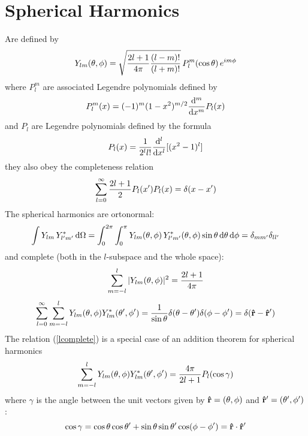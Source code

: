 \section{Spherical Harmonics}

Are defined by 
\begin{equation*}
  Y_{lm}(\theta,\phi)=\sqrt{{2l+1\over4\pi}{(l-m)!\over(l+m)!}}\,P_l^m(\cos\theta)\,e^{im\phi}
\end{equation*}
where $P_l^m$ are associated Legendre polynomials defined by 
\begin{equation*}
  P_l^m(x)=(-1)^m (1-x^2)^{m/2}{{\rm d}^m\over{\rm d} x^m} P_l(x)
\end{equation*}
and $P_l$ are Legendre polynomials defined by the formula 
\begin{equation*}
  P_l(x)={1\over2^l l!}{{\rm d}^l\over{\rm d} x^l}[(x^2-1)^l]
\end{equation*}
they also obey the completeness relation 
\begin{equation}
  \sum_{l=0}^\infty {2l+1\over2}P_l(x')P_l(x)=\delta(x-x')  \label{Lorto}
\end{equation}
The spherical harmonics are ortonormal: 
\begin{equation}
  \int Y_{lm}\,Y^*_{l'm'}\,{\rm d}\Omega = \int_0^{2\pi}\int_0^{\pi} Y_{lm}(\theta,\phi)\,Y^*_{l'm'}(\theta,\phi)\sin\theta\,{\rm d}\theta\,{\rm d}\phi = \delta_{mm'}\delta_{ll'}  \label{Yorto}
\end{equation}
and complete (both in the $l$-subspace and the whole space): 
\begin{equation}
  \sum_{m=-l}^l|Y_{lm}(\theta,\phi)|^2={2l+1\over4\pi}  \label{lcomplete}
\end{equation}
\begin{equation}
  \sum_{l=0}^\infty\sum_{m=-l}^lY_{lm}(\theta,\phi)Y_{lm}^*(\theta',\phi') ={1\over\sin\theta}\delta(\theta-\theta')\delta(\phi-\phi')= \delta({\bf\hat r}-{\bf\hat r'})  \label{Ycomplete}
\end{equation}
The relation (\ref{lcomplete}) is a special case of an addition theorem for spherical harmonics 
\begin{equation}
  \sum_{m=-l}^lY_{lm}(\theta,\phi)Y_{lm}^*(\theta',\phi')= {4\pi\over 2l+1}P_l(\cos\gamma)  \label{lsum}
\end{equation}
where $\gamma$ is the angle between the unit vectors given by ${\bf\hat r}=(\theta,\phi)$ and ${\bf\hat r'}=(\theta',\phi')$: 
\begin{equation*}
  \cos\gamma=\cos\theta\cos\theta'+\sin\theta\sin\theta'\cos(\phi-\phi') ={\bf\hat r}\cdot{\bf\hat r'}
\end{equation*}

